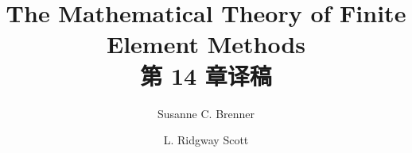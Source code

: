 \documentclass[a4paper,UTF8,12pt]{ctexart}
\title{The Mathematical Theory of Finite Element Methods\\第 14 章译稿}
\author{Susanne C. Brenner \and L. Ridgway Scott}
\date{}
\begin{document}
\maketitle
\setcounter{section}{13}
\renewcommand{\thethmcount}{\thesubsection.\arabic{thmcount}}
\renewcommand{\theequation}{\thesubsection.\arabic{equation}}
\renewcommand{\thefigure}{\thesection.\arabic{figure}}
\renewcommand{\thetable}{\thesection.\arabic{table}}

\end{document}
